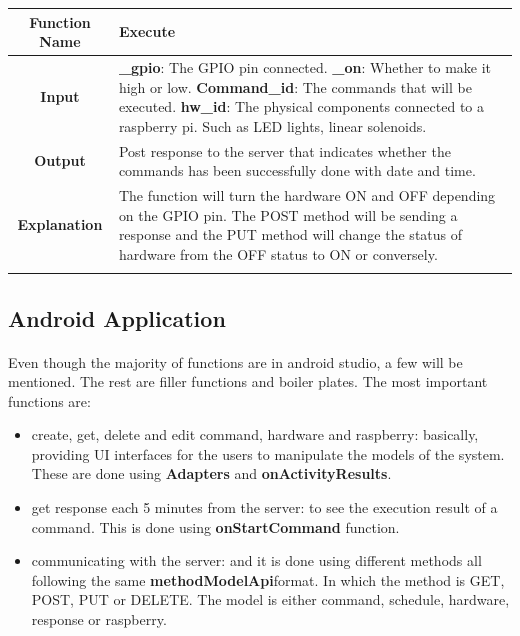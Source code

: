 \documentclass[12pt, oneside, a4paper]{book}
\newcommand\boldcolor[1]{\textcolor{bold}{\textbf{#1}}}
\newcommand\Includegraphics[2][]{\addvbuffer[3pt 0pt]{\texttt{[image: \#2]}}}
\begin{document}
		\begin{table}[H]
		\begin{center}
			\begin{tabularx}{\linewidth}{|c|X|}\hline
				\boldcolor{Function Name} & \textbf{Execute} \\\hline
				\boldcolor{Input} & \textbf{\_gpio}: The GPIO pin connected.
				\textbf{ \_on}: Whether to make it high or low.
				\textbf{Command\_id}: The commands that will be executed.
				\textbf{hw\_id}: The physical components connected to a raspberry pi. Such as LED lights, linear solenoids.
							
				\\\hline
				\boldcolor{Output} & Post response to the server that indicates whether the commands has been successfully done with date and time.\\\hline
				\boldcolor{Explanation} & 
				The function will turn the hardware ON and OFF depending on the GPIO pin. The POST method will be sending a response and the PUT method will change the status of hardware from the OFF status to ON or conversely.    \\\hline
				\multicolumn{2}{|c|}{\Includegraphics[width=.5\linewidth]{img/code_exec.png}}
				\\\hline
			\end{tabularx}
		\end{center}
	\end{table}

		\newpage\subsection{Android Application}
		\paragraph{} Even though the majority of functions are in android studio, a few will be mentioned. The rest are filler functions and boiler plates. The most important functions are:
		\begin{itemize}
			\item create, get, delete and edit command, hardware and raspberry: basically, providing UI interfaces for the users to manipulate the models of the system. These are done using \textbf{Adapters} and \textbf{onActivityResults}.
			\item get response each 5 minutes from the server: to see the execution result of a command. This is done using \textbf{onStartCommand} function.
			\item communicating with the server: and it is done using different methods all following the same \textbf{methodModelApi}format. In which the method is GET, POST, PUT or DELETE. The model is either command, schedule, hardware, response or raspberry.
		\end{itemize} 
			
\end{document}
